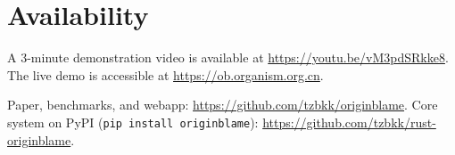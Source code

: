 \section{Availability}

A 3-minute demonstration video is available at \url{https://youtu.be/vM3pdSRkke8}. The live demo is accessible at \url{https://ob.organism.org.cn}.

Paper, benchmarks, and webapp: \url{https://github.com/tzbkk/originblame}. Core system on PyPI (\texttt{pip install originblame}): \url{https://github.com/tzbkk/rust-originblame}.